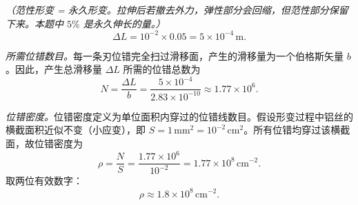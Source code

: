 \begin{derivationbox}[标准解题过程]
\textit{（范性形变 = 永久形变。拉伸后若撤去外力，弹性部分会回缩，但范性部分保留下来。本题中 $5\%$ 是永久伸长的量。）}
\begin{equation}
\Delta L = 10^{-2}\times 0.05 = 5\times 10^{-4}\,\mathrm{m}.
\end{equation}

\textit{所需位错数目。}每一条刃位错完全扫过滑移面，产生的滑移量为一个伯格斯矢量 $b$。因此，产生总滑移量 $\Delta L$ 所需的位错总数为
\begin{equation}
N = \frac{\Delta L}{b} = \frac{5\times 10^{-4}}{2.83\times 10^{-10}}
\approx 1.77\times 10^{6}.
\end{equation}

\textit{位错密度。}位错密度定义为单位面积内穿过的位错线数目。假设形变过程中铝丝的横截面积近似不变（小应变），即 $S=1\,\mathrm{mm^2}=10^{-2}\,\mathrm{cm^2}$。所有位错均穿过该横截面，故位错密度为
\begin{equation}
\rho = \frac{N}{S} = \frac{1.77\times 10^{6}}{10^{-2}}
= 1.77\times 10^{8}\,\mathrm{cm^{-2}}.
\end{equation}
取两位有效数字：
\begin{equation}
\boxed{\rho \approx 1.8\times 10^{8}\,\mathrm{cm^{-2}}.}
\end{equation}
\end{derivationbox}

